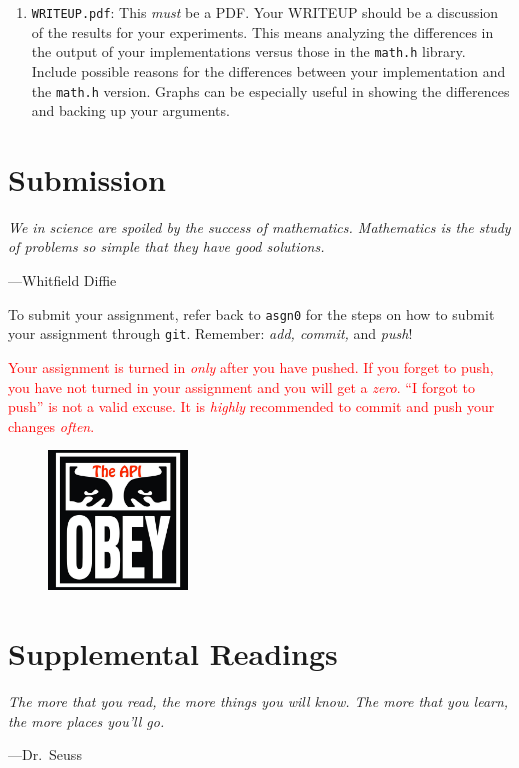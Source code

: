\documentclass[11pt]{article}
\begin{document}
\begin{enumerate}
  \item \texttt{WRITEUP.pdf}: This \emph{must} be a PDF. Your WRITEUP should be a discussion of the results for your
  experiments. This means analyzing the differences in the output of
  your implementations versus those in the \texttt{math.h} library.
  Include possible reasons for the differences between your implementation
  and the \texttt{math.h} version. Graphs can be especially useful
  in showing the differences and backing up your arguments.

\end{enumerate}



\section{Submission}
\epigraph{\emph{We in science are spoiled by the success of mathematics.
Mathematics is the study of problems so simple that they have good
solutions.}}{---Whitfield Diffie}

To submit your assignment, refer back to \texttt{asgn0} for the steps on how to submit your assignment through \texttt{git}. Remember: \emph{add, commit,} and \emph{push}!

\textcolor{red}{Your assignment is turned in \emph{only} after you have pushed.
If you forget to push, you have not turned in your assignment and you will get
a \emph{zero}. ``I forgot to push'' is not a valid excuse. It is \emph{highly} recommended to commit and push your changes \emph{often}.}

\begin{figure}[ht]
  \centering
    \includegraphics[width=0.33\textwidth]{../assignment1/obey.jpg}
\end{figure}

\section{Supplemental Readings} 
\epigraph{\emph{The more that you read, the more things you will know. The 
more that you learn, the more places you'll go.}}{---Dr.\ Seuss}\noindent 
 
\end{document}
